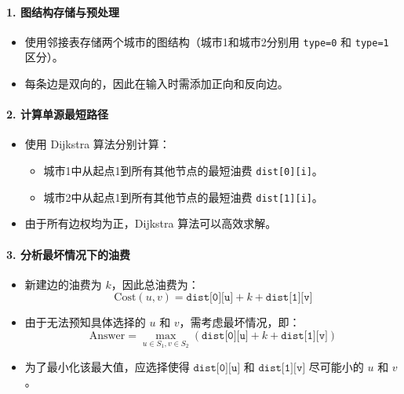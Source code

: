 \documentclass[../mainReport.tex]{subfiles}
\begin{document}
\paragraph{1. 图结构存储与预处理}
\begin{itemize}
    \item 使用邻接表存储两个城市的图结构（城市1和城市2分别用 \texttt{type=0} 和 \texttt{type=1} 区分）。
    \item 每条边是双向的，因此在输入时需添加正向和反向边。
\end{itemize}

\paragraph{2. 计算单源最短路径}
\begin{itemize}
    \item 使用 Dijkstra 算法分别计算：
        \begin{itemize}
            \item 城市1中从起点1到所有其他节点的最短油费 \texttt{dist[0][i]}。
            \item 城市2中从起点1到所有其他节点的最短油费 \texttt{dist[1][i]}。
        \end{itemize}
    \item 由于所有边权均为正，Dijkstra 算法可以高效求解。
\end{itemize}

\paragraph{3. 分析最坏情况下的油费}
\begin{itemize}
    \item 新建边的油费为 $k$，因此总油费为：
        $$
        \text{Cost}(u, v) = \texttt{dist[0][u]} + k + \texttt{dist[1][v]}
        $$
    \item 由于无法预知具体选择的 $u$ 和 $v$，需考虑最坏情况，即：
        $$
        \text{Answer} = \max_{u \in S_1, v \in S_2} \left( \texttt{dist[0][u]} + k + \texttt{dist[1][v]} \right)
        $$
    \item 为了最小化该最大值，应选择使得 $\texttt{dist[0][u]}$ 和 $\texttt{dist[1][v]}$ 尽可能小的 $u$ 和 $v$。
\end{itemize}
\end{document}

